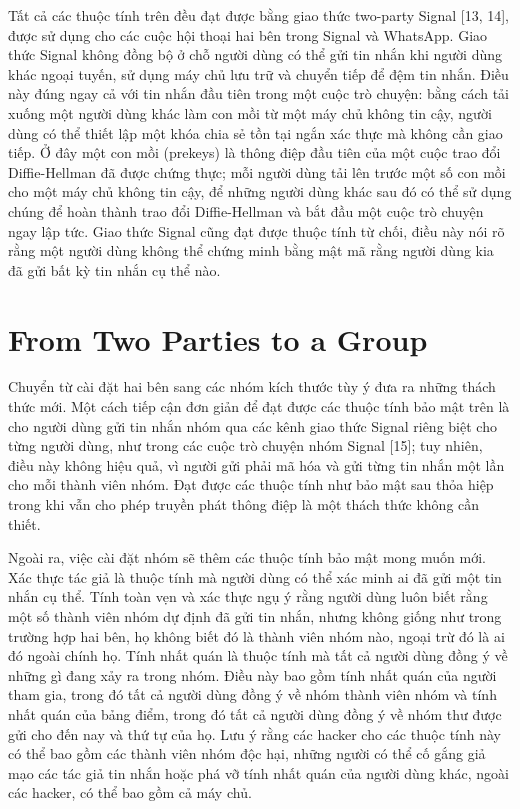 \documentclass[../main-report.tex]{subfiles}
\begin{document}
Tất cả các thuộc tính trên đều đạt được bằng giao thức two-party Signal [13, 14], được sử dụng cho các cuộc hội thoại hai bên trong Signal và WhatsApp. Giao thức Signal không đồng bộ ở chỗ người dùng có thể gửi tin nhắn khi người dùng khác ngoại tuyến, sử dụng máy chủ lưu trữ và chuyển tiếp để đệm tin nhắn. Điều này đúng ngay cả với tin nhắn đầu tiên trong một cuộc trò chuyện: bằng cách tải xuống một người dùng khác làm con mồi từ một máy chủ không tin cậy, người dùng có thể thiết lập một khóa chia sẻ tồn tại ngắn xác thực mà không cần giao tiếp. Ở đây một con mồi (prekeys) là thông điệp đầu tiên của một cuộc trao đổi Diffie-Hellman đã được chứng thực; mỗi người dùng tải lên trước một số con mồi cho một máy chủ không tin cậy, để những người dùng khác sau đó có thể sử dụng chúng để hoàn thành trao đổi Diffie-Hellman và bắt đầu một cuộc trò chuyện ngay lập tức. Giao thức Signal cũng đạt được thuộc tính từ chối, điều này nói rõ rằng một người dùng không thể chứng minh bằng mật mã rằng người dùng kia đã gửi bất kỳ tin nhắn cụ thể nào.


\section{From Two Parties to a Group}

Chuyển từ cài đặt hai bên sang các nhóm kích thước tùy ý đưa ra những thách thức mới. Một cách tiếp cận đơn giản để đạt được các thuộc tính bảo mật trên là cho người dùng gửi tin nhắn nhóm qua các kênh giao thức Signal riêng biệt cho từng người dùng, như trong các cuộc trò chuyện nhóm Signal [15]; tuy nhiên, điều này không hiệu quả, vì người gửi phải mã hóa và gửi từng tin nhắn một lần cho mỗi thành viên nhóm. Đạt được các thuộc tính như bảo mật sau thỏa hiệp trong khi vẫn cho phép truyền phát thông điệp là một thách thức không cần thiết.

Ngoài ra, việc cài đặt nhóm sẽ thêm các thuộc tính bảo mật mong muốn mới. Xác thực tác giả là thuộc tính mà người dùng có thể xác minh ai đã gửi một tin nhắn cụ thể. Tính toàn vẹn và xác thực ngụ ý rằng người dùng luôn biết rằng một số thành viên nhóm dự định đã gửi tin nhắn, nhưng không giống như trong trường hợp hai bên, họ không biết đó là thành viên nhóm nào, ngoại trừ đó là ai đó ngoài chính họ. Tính nhất quán là thuộc tính mà tất cả người dùng đồng ý về những gì đang xảy ra trong nhóm. Điều này bao gồm tính nhất quán của người tham gia, trong đó tất cả người dùng đồng ý về nhóm thành viên nhóm và tính nhất quán của bảng điểm, trong đó tất cả người dùng đồng ý về nhóm thư được gửi cho đến nay và thứ tự của họ. Lưu ý rằng các hacker cho các thuộc tính này có thể bao gồm các thành viên nhóm độc hại, những người có thể cố gắng giả mạo các tác giả tin nhắn hoặc phá vỡ tính nhất quán của người dùng khác, ngoài các hacker, có thể bao gồm cả máy chủ.
\end{document}
